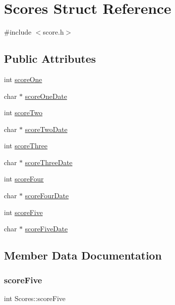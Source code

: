 \hypertarget{struct_scores}{}\section{Scores Struct Reference}
\label{struct_scores}


{\ttfamily \#include $<$score.\+h$>$}

\subsection*{Public Attributes}
\begin{DoxyCompactItemize}
\item 
int \mbox{\hyperlink{struct_scores_a6aca31bb273b6fad076dc50a5a6e3a8e}{score\+One}}
\item 
char $\ast$ \mbox{\hyperlink{struct_scores_a5986b967a1bad15dd675bfa65365f842}{score\+One\+Date}}
\item 
int \mbox{\hyperlink{struct_scores_ac138adaf6d9c61b3e6c8ee88915c3c31}{score\+Two}}
\item 
char $\ast$ \mbox{\hyperlink{struct_scores_a6eb8b4bc814ae505d20c5c77c8e19c96}{score\+Two\+Date}}
\item 
int \mbox{\hyperlink{struct_scores_aec915cffa1ccb8645ad6ee54b359f687}{score\+Three}}
\item 
char $\ast$ \mbox{\hyperlink{struct_scores_a4e480e0715f82dc3e69dbcd87c6290af}{score\+Three\+Date}}
\item 
int \mbox{\hyperlink{struct_scores_ac054163467e4a504f597ff797c82d801}{score\+Four}}
\item 
char $\ast$ \mbox{\hyperlink{struct_scores_adf4634c7d0242005e8296f5ad771396a}{score\+Four\+Date}}
\item 
int \mbox{\hyperlink{struct_scores_af612fcb18aa267e7f2a870fab6e47078}{score\+Five}}
\item 
char $\ast$ \mbox{\hyperlink{struct_scores_a2969fd6fb35ea3cb390ac89b825bec99}{score\+Five\+Date}}
\end{DoxyCompactItemize}


\subsection{Member Data Documentation}
\mbox{\label{struct_scores_af612fcb18aa267e7f2a870fab6e47078}} 
\subsubsection{\texorpdfstring{scoreFive}{scoreFive}}
{\footnotesize\ttfamily int Scores\+::score\+Five}

